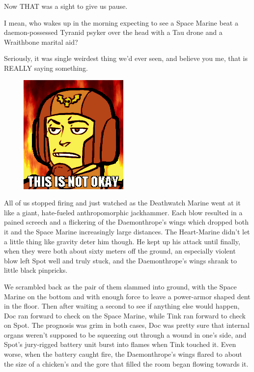 Now THAT was a sight to give us pause. 


I mean, who wakes up in the morning expecting to see a Space Marine beat a daemon-possessed Tyranid psyker over the head with a Tau drone and a Wraithbone marital aid? 


Seriously, it was single weirdest thing we'd ever seen, and believe you me, that is REALLY saying something.

\begin{figure}
	\begin{center}
		\includegraphics[width=\figwidth]{pics/16/59.png}
	\end{center}
\end{figure}
All of us stopped firing and just watched as the Deathwatch Marine went at it like a giant, hate-fueled anthropomorphic jackhammer. 
Each blow resulted in a pained screech and a flickering of the Daemonthrope's wings which dropped both it and the Space Marine increasingly large distances. 
The Heart-Marine didn't let a little thing like gravity deter him though. 
He kept up his attack until finally, when they were both about sixty meters off the ground, an especially violent blow left Spot well and truly stuck, and the Daemonthrope's wings shrank to little black pinpricks.

We scrambled back as the pair of them slammed into ground, with the Space Marine on the bottom and with enough force to leave a power-armor shaped dent in the floor. 
Then after waiting a second to see if anything else would happen, Doc ran forward to check on the Space Marine, while Tink ran forward to check on Spot. 
The prognosis was grim in both cases, Doc was pretty sure that internal organs weren't supposed to be squeezing out through a wound in one's side, and Spot's jury-rigged battery unit burst into flames when Tink touched it. 
Even worse, when the battery caught fire, the Daemonthrope's wings flared to about the size of a chicken's and the gore that filled the room began flowing towards it.

